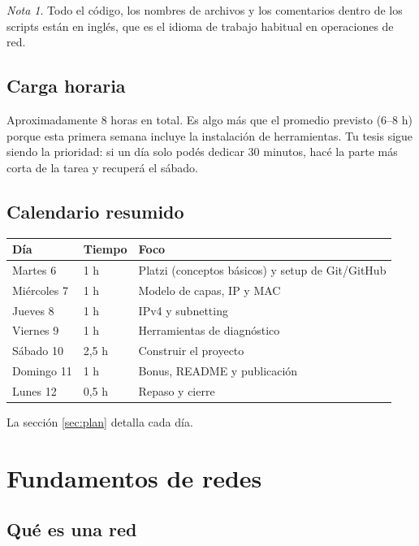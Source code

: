 \documentclass[11pt,a4paper]{article}
\theoremstyle{definition}
\theoremstyle{remark}
\newtheorem{nota}{Nota}[section]
\begin{document}
\begin{nota}
Todo el código, los nombres de archivos y los comentarios dentro de los scripts están en inglés, que es el idioma de trabajo habitual en operaciones de red.
\end{nota}

\subsection{Carga horaria}

Aproximadamente 8 horas en total. Es algo más que el promedio previsto (6--8 h) porque esta primera semana incluye la instalación de herramientas. Tu tesis sigue siendo la prioridad: si un día solo podés dedicar 30 minutos, hacé la parte más corta de la tarea y recuperá el sábado.

\subsection{Calendario resumido}

\begin{center}
\begin{tabular}{@{}llp{8.2cm}@{}}
\toprule
\textbf{Día} & \textbf{Tiempo} & \textbf{Foco}\\
\midrule
Martes 6 & 1 h & Platzi (conceptos básicos) y setup de Git/GitHub\\
Miércoles 7 & 1 h & Modelo de capas, IP y MAC\\
Jueves 8 & 1 h & IPv4 y subnetting\\
Viernes 9 & 1 h & Herramientas de diagnóstico\\
Sábado 10 & 2,5 h & Construir el proyecto\\
Domingo 11 & 1 h & Bonus, README y publicación\\
Lunes 12 & 0,5 h & Repaso y cierre\\
\bottomrule
\end{tabular}
\end{center}

La sección \ref{sec:plan} detalla cada día.

\section{Fundamentos de redes}\label{sec:fundamentos}

\subsection{Qué es una red}
\end{document}
